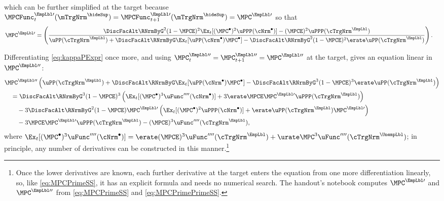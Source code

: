 \documentclass{econark}
\begin{document}
which can be further simplified at the target because $\MPCFunc^{\EmpLbl \prime}_{t}(\mTrgNrm^{\hideSup}) = \MPCFunc^{\EmpLbl \prime}_{t+1}(\mTrgNrm^{\hideSup}) = \MPC^{\EmpLbl \prime}$ so that
\begin{equation}\begin{gathered}\begin{aligned}
\MPC^{\EmpLbl\prime} & =  \left(\frac{\DiscFacAlt \RNrmByG^{2} (1-\MPCE)^{2}\Ex_{t}[(\MPC^{\bullet})^{2} \uPPP(\cNrm^{\bullet})] -(\MPCE)^{2} \uPPP(\cTrgNrm^{\EmpLbl})}{\uPP(\cTrgNrm^{\EmpLbl}) + \DiscFacAlt \RNrmByG \Ex_{t}[\uPP(\cNrm^{\bullet})\MPC^{\bullet}]- \DiscFacAlt \RNrmByG^{2} (1-\MPCE)^{2}\erate \uPP(\cTrgNrm^{\EmpLbl})}\right) \label{eq:MPCPrimeSS}
.
\end{aligned}\end{gathered}\end{equation}

Differentiating \eqref{eq:kappaPExpr} once more, and using $\MPC^{\EmpLbl\prime\prime}_{t}=\MPC^{\EmpLbl\prime\prime}_{t+1}=\MPC^{\EmpLbl\prime\prime}$ at the target, gives an equation linear in $\MPC^{\EmpLbl\prime\prime}$:
\begin{equation}\begin{gathered}\begin{aligned}
& \MPC^{\EmpLbl\prime\prime}\left(\uPP(\cTrgNrm^{\EmpLbl})+\DiscFacAlt \RNrmByG \Ex_{t}[\uPP(\cNrm^{\bullet})\MPC^{\bullet}]-\DiscFacAlt \RNrmByG^{3} (1-\MPCE)^{3}\erate \uPP(\cTrgNrm^{\EmpLbl})\right)
\\ & \quad = \DiscFacAlt \RNrmByG^{3} (1-\MPCE)^{3}\left(\Ex_{t}[(\MPC^{\bullet})^{3}\uFunc^{\prime\prime\prime\prime}(\cNrm^{\bullet})]+3\erate\MPCE\MPC^{\EmpLbl\prime}\uPPP(\cTrgNrm^{\EmpLbl})\right)
\\ & \qquad -3\DiscFacAlt\RNrmByG^{2}(1-\MPCE)\MPC^{\EmpLbl\prime}\left(\Ex_{t}[(\MPC^{\bullet})^{2}\uPPP(\cNrm^{\bullet})]+\erate\uPP(\cTrgNrm^{\EmpLbl})\MPC^{\EmpLbl\prime}\right)
\\ & \qquad -3\MPCE\MPC^{\EmpLbl\prime}\uPPP(\cTrgNrm^{\EmpLbl})-(\MPCE)^{3}\uFunc^{\prime\prime\prime\prime}(\cTrgNrm^{\EmpLbl}) , \label{eq:MPCPrimePrimeSS}
\end{aligned}\end{gathered}\end{equation}
where $\Ex_{t}[(\MPC^{\bullet})^{3}\uFunc^{\prime\prime\prime\prime}(\cNrm^{\bullet})] = \erate(\MPCE)^{3}\uFunc^{\prime\prime\prime\prime}(\cTrgNrm^{\EmpLbl})+\urate\MPC^{3}\uFunc^{\prime\prime\prime\prime}(\cTrgNrm^{\UnempLbl})$; in principle, any number of derivatives can be constructed in this manner.\footnote{Once the lower derivatives are known, each further derivative at the target enters the equation from one more differentiation linearly, so, like \eqref{eq:MPCPrimeSS}, it has an explicit formula and needs no numerical search.  The handout's notebook computes $\MPC^{\EmpLbl\prime}$ and $\MPC^{\EmpLbl\prime\prime}$ from \eqref{eq:MPCPrimeSS} and \eqref{eq:MPCPrimePrimeSS}.}
\end{document}
